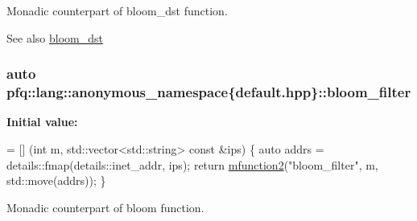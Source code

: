 Monadic counterpart of {\ttfamily bloom\+\_\+dst} function. 

\begin{DoxySeeAlso}{See also}
\hyperlink{namespacepfq_1_1lang_1_1anonymous__namespace_02default_8hpp_03_ac1c667000a13acfbda8490d5748b91c4}{bloom\+\_\+dst} 
\end{DoxySeeAlso}
\hypertarget{namespacepfq_1_1lang_1_1anonymous__namespace_02default_8hpp_03_a3a5eda5d7a49e279941725df8388378d}{
\subsubsection[{bloom\+\_\+filter}]{\setlength{\rightskip}{0pt plus 5cm}auto pfq\+::lang\+::anonymous\+\_\+namespace\{default.\+hpp\}\+::bloom\+\_\+filter}}\label{namespacepfq_1_1lang_1_1anonymous__namespace_02default_8hpp_03_a3a5eda5d7a49e279941725df8388378d}
{\bfseries Initial value\+:}
\begin{DoxyCode}
= [] (\textcolor{keywordtype}{int} m, std::vector<std::string> \textcolor{keyword}{const} &ips) \{
                                    \textcolor{keyword}{auto} addrs = details::fmap(details::inet\_addr, ips);
                                    \textcolor{keywordflow}{return} \hyperlink{namespacepfq_1_1lang_aab1a000712bb2711044255ca1626cc84}{mfunction2}(\textcolor{stringliteral}{"bloom\_filter"}, m, std::move(addrs));
                                \}
\end{DoxyCode}


Monadic counterpart of {\ttfamily bloom} function. 

